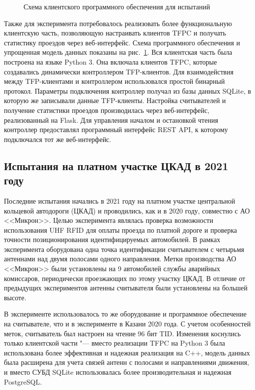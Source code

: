 \begin{figure}[ht]
  \caption{Схема клиентского программного обеспечения для испытаний}
  \label{fig:ch5_kazan2020_client}
\end{figure}

Также для эксперимента потребовалось реализовать более функциональную клиентскую часть, позволяющую настраивать клиентов TFPC и получать статистику проездов через веб-интерфейс. Схема программного обеспечения и упрощенная модель данных показаны на рис.~\ref{fig:ch5_kazan2020_client}. Вся клиентская часть была построена на языке Python 3. Она включала клиентов TFPC, которые создавались динамически контроллером TFP-клиентов. Для взаимодействия между TFP-клиентами и контроллером использовался простой бинарный протокол. Параметры подключения контроллер получал из базы данных SQLite, в которую же записывали данные TFP-клиенты. Настройка считывателей и получение статистики проездов производилась через веб-интерфейс, реализованный на Flask. Для управления началом и остановкой чтения контроллер предоставлял программный интерфейс REST API, к которому подключался тот же веб-интерфейс.


\subsection{Испытания на платном участке ЦКАД в 2021 году}\label{sec:ch5_experiments_ckad2021}

Последние испытания начались в 2021 году на платном участке центральной кольцевой автодороги (ЦКАД) и проводились, как и в 2020 году, совместно с АО <<Микрон>>. Целью эксперимента являлась проверка возможности использования UHF RFID для оплаты проезда по платной дороге и проверка точности позиционирования идентифицируемых автомобилей. В рамках эксперимента оборудована одна точка идентификации считывателем с четырьмя антеннами над двумя полосами одного направления. Метки производства АО <<Микрон>> были установлены на 9 автомобилей службы аварийных комиссаров, периодически проезжающих по этому участку ЦКАД. В отличие от предыдущих экспериментов антенны считывателя были установлены на большей высоте.

В эксперименте использовалось то же оборудование и программное обеспечение на считывателе, что и в эксперименте в Казани 2020 года. С учетом особенностей меток, считыватель был настроен на чтение 96 бит TID. Изменения коснулись только клиентской части "--- вместо реализации TFPC на Python 3 была использована более эффективная и надежная реализация на C++, модель данных была расширена для учета связей антенн с полосами и направлениями движения, и вместо СУБД SQLite использовалась более производительная и надежная PostgreSQL.

